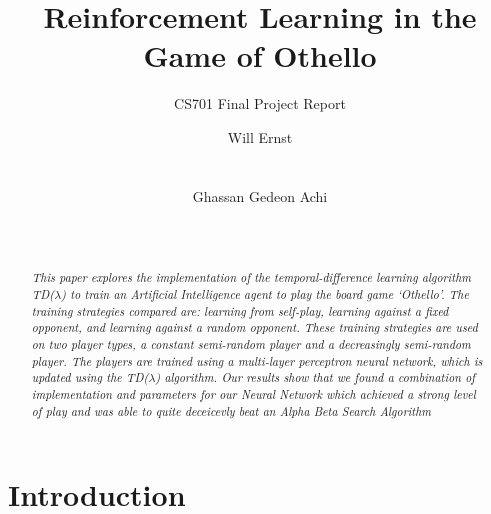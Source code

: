 \documentclass{sig-alternate-05-2015}
\begin{document}
\title{Reinforcement Learning in the Game of Othello} 

\subtitle{CS701 Final Project Report}


\author{
%
\alignauthor
Will Ernst\\
       \\
       \\
\alignauthor
Ghassan Gedeon Achi\\
       \\
       \\
}

\maketitle

\begin{abstract}

	\textit{This paper explores the implementation of the temporal-difference learning algorithm TD(\(\lambda\)) to train an Artificial Intelligence agent to play the board game `Othello'. The training strategies compared are: learning from self-play, learning against a fixed opponent, and learning against a random opponent. These training strategies are used on two player types, a constant semi-random player and a decreasingly semi-random player. The players are trained using a multi-layer perceptron neural network, which is updated using the TD(\(\lambda\)) algorithm. Our results show that we found a combination of implementation and parameters for our Neural Network which achieved a strong level of play and was able to quite deceicevly beat an Alpha Beta Search Algorithm}

\end{abstract}



\section{Introduction}
\end{document}
